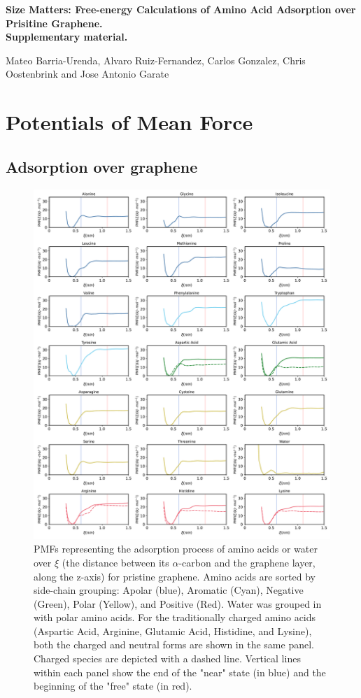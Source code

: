 \documentclass[9pt]{article}
\begin{document}
\noindent\LARGE{\textbf{Size Matters: Free-energy Calculations of Amino Acid Adsorption over Prisitine Graphene. \\ Supplementary material.}} \\
\vspace{0.1cm} %

\noindent\large{Mateo Barria-Urenda, Alvaro Ruiz-Fernandez, Carlos Gonzalez, Chris Oostenbrink and Jose Antonio Garate}

\tableofcontents

\newpage

\section{Potentials of Mean Force}
\subsection{Adsorption over graphene}

\begin{figure}[hbtp]
    \centering
    \includegraphics[width=.9\textwidth]{FigS1.pdf}
    \caption{PMFs representing the adsorption process of amino acids or water over $\xi$ (the distance between its $\alpha$-carbon and the graphene layer, along the z-axis) for pristine graphene. Amino acids are sorted by side-chain grouping: Apolar (blue), Aromatic (Cyan), Negative (Green), Polar (Yellow), and Positive (Red). Water was grouped in with polar amino acids. For the traditionally charged amino acids (Aspartic Acid, Arginine, Glutamic Acid,  Histidine, and Lysine), both the charged and neutral forms are shown in the same panel. Charged species are depicted with a dashed line. Vertical lines within each panel show the end of the "near" state (in blue) and the beginning of the "free" state (in red).}
    \label{fig:PMFs}
\end{figure}
\end{document}
